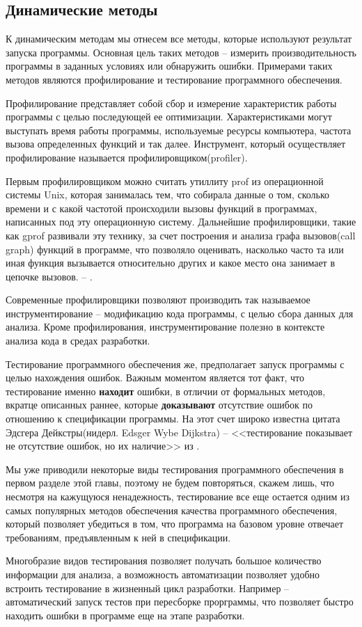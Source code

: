 \subsection{Динамические методы}

К динамическим методам мы отнесем все методы, которые используют результат запуска программы. Основная цель таких методов -- измерить производительность программы в заданных условиях или обнаружить ошибки. Примерами таких методов являются профилирование и тестирование программного обеспечения.

Профилирование представляет собой сбор и измерение характеристик работы программы с целью последующей ее оптимизации. Характеристиками могут выступать время работы программы, используемые ресурсы компьютера, частота вызова определенных функций и так далее. Инструмент, который осуществляет профилирование называется профилировщиком(profiler).

Первым профилировщиком можно считать утиллиту prof из операционной системы Unix, которая занималась тем, что собирала данные о том, сколько времени и с какой частотой происходили вызовы функций в программах, написанных под эту операционную систему. Дальнейшие профилировщики, такие как gprof развивали эту технику, за счет построения и анализа графа вызовов(call graph) функций в программе, что позволяло оценивать, насколько часто та или иная функция вызывается относительно других и какое место она занимает в цепочке вызовов. -- \cite{Graham:1982:GCG:872726.806987}.

Современные профилировщики позволяют производить так называемое инструментирование -- модификацию кода программы, с целью сбора данных для анализа. Кроме профилирования, инструментирование полезно в контексте анализа кода в средах разработки.

Тестирование программного обеспечения же, предполагает запуск программы с целью нахождения ошибок. Важным моментом является тот факт, что тестирование именно \textbf{находит} ошибки, в отличии от формальных методов, вкратце описанных раннее, которые \textbf{доказывают} отсутствие ошибок по отношению к спецификации программы. На этот счет широко известна цитата Эдсгера Дейкстры(нидерл. Edsger Wybe Dijkstra) -- <<тестирование показывает не отсутствие ошибок, но их наличие>> из \cite{buxton1970software}.

Мы уже приводили некоторые виды тестирования программного обеспечения в первом разделе этой главы, поэтому не будем повторяться, скажем лишь, что несмотря на кажущуюся ненадежность, тестирование все еще остается одним из самых популярных методов обеспечения качества программного обеспечения, который позволяет убедиться в том, что программа на базовом уровне отвечает требованиям, предъявленным к ней в спецификации.

Многобразие видов тестирования позволяет получать большое количество информации для анализа, а возможность автоматизации позволяет удобно встроить тестирование в жизненный цикл разработки. Например -- автоматический запуск тестов при пересборке прорграммы, что позволяет быстро находить ошибки в программе еще на этапе разработки.

